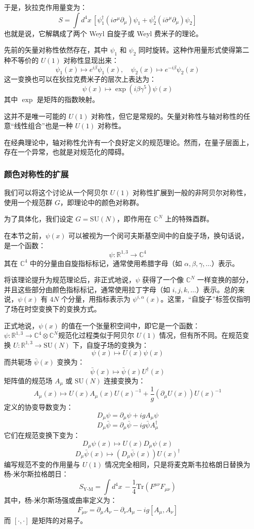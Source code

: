 于是，狄拉克作用量变为：
\[
S = \int d^4x \, \left[ \psi_1^\dagger (i\sigma^\mu \partial_\mu) \psi_1 + \psi_2^\dagger (i\bar{\sigma}^\mu \partial_\mu) \psi_2 \right]~
\]
也就是说，它解耦成了两个 Weyl 自旋子或 Weyl 费米子的理论。

先前的矢量对称性依然存在，其中 \(\psi_1\) 和 \(\psi_2\) 同时旋转。这种作用量形式使得第二种不等价的 \( U(1) \) 对称性显现出来：
\[
\psi_1(x) \mapsto e^{i\beta} \psi_1(x), \quad \psi_2(x) \mapsto e^{-i\beta} \psi_2(x)~
\]
这一变换也可以在狄拉克费米子的层次上表达为：
\[
\psi(x) \mapsto \exp(i\beta \gamma^5) \psi(x)~
\]
其中 \(\exp\) 是矩阵的指数映射。

这并不是唯一可能的 \( U(1) \) 对称性，但它是常规的。矢量对称性与轴对称性的任意“线性组合”也是一种 \( U(1) \) 对称性。

在经典理论中，轴对称性允许有一个良好定义的规范理论。然而，在量子层面上，存在一个异常，也就是对规范化的障碍。
\subsubsection{颜色对称性的扩展}
我们可以将这个讨论从一个阿贝尔 \( U(1) \) 对称性扩展到一般的非阿贝尔对称性，使用一个规范群 \( G \)，即理论中的颜色对称群。

为了具体化，我们设定 \( G = \text{SU}(N) \)，即作用在 \( \mathbb{C}^N \) 上的特殊酉群。

在本节之前，\(\psi(x)\) 可以被视为一个闵可夫斯基空间中的自旋子场，换句话说，是一个函数：
\[
\psi : \mathbb{R}^{1,3} \to \mathbb{C}^4~
\]
其在 \( \mathbb{C}^4 \) 中的分量由自旋指标标记，通常使用希腊字母（如 \( \alpha, \beta, \gamma, \dots \)）表示。

将该理论提升为规范理论后，非正式地说，\(\psi\) 获得了一个像 \( \mathbb{C}^N \) 一样变换的部分，并且这些部分由颜色指标标记，通常使用拉丁字母（如 \( i, j, k, \dots \)）表示。总的来说，\(\psi(x)\) 有 \( 4N \) 个分量，用指标表示为 \( \psi^{i,\alpha}(x) \)。这里，“自旋子”标签仅指明了场在时空变换下的变换方式。

正式地说，\(\psi(x)\) 的值在一个张量积空间中，即它是一个函数：\(\psi : \mathbb{R}^{1,3} \to \mathbb{C}^4 \otimes \mathbb{C}^N\)规范化过程类似于阿贝尔 \( U(1) \) 情况，但有所不同。在规范变换 \( U : \mathbb{R}^{1,3} \to \text{SU}(N) \) 下，自旋子场的变换为：
\[
\psi(x) \mapsto U(x) \psi(x)~
\]
而共轭场 \( \bar{\psi}(x) \) 变换为：
\[
\bar{\psi}(x) \mapsto \bar{\psi}(x) U^{\dagger}(x)~
\]
矩阵值的规范场 \( A_{\mu} \) 或 \( \text{SU}(N) \) 连接变换为：
\[
A_{\mu}(x) \mapsto U(x) A_{\mu}(x) U(x)^{-1} + \frac{1}{g} (\partial_\mu U(x)) U(x)^{-1}~
\]
定义的协变导数变为：
\[
D_{\mu} \psi = \partial_\mu \psi + ig A_{\mu} \psi~
\]
\[
D_{\mu} \bar{\psi} = \partial_\mu \bar{\psi} - ig \bar{\psi} A_{\mu}^{\dagger}~
\]
它们在规范变换下变为：
\[
D_{\mu} \psi(x) \mapsto U(x) D_{\mu} \psi(x)~
\]
\[
D_{\mu} \bar{\psi}(x) \mapsto (D_{\mu} \bar{\psi}(x)) U(x)^{\dagger}~
\]
编写规范不变的作用量与 \( U(1) \) 情况完全相同，只是将麦克斯韦拉格朗日替换为杨-米尔斯拉格朗日：
\[
S_{\text{Y-M}} = \int d^{4}x \, -\frac{1}{4} \text{Tr}(F^{\mu \nu} F_{\mu \nu})~
\]
其中，杨-米尔斯场强或曲率定义为：
\[
F_{\mu \nu} = \partial_\mu A_\nu - \partial_\nu A_\mu - ig [A_\mu, A_\nu]~
\]
而 \([ \cdot , \cdot ]\) 是矩阵的对易子。


